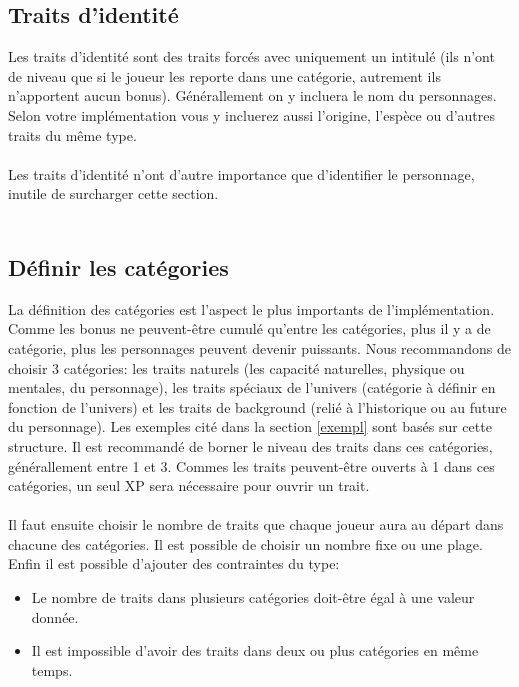 \documentclass[a4paper,10pt,twoside,twocolumn]{article}
\begin{document}
 \subsection{Traits d'identité}
 \label{implem::traits}
 
 Les traits d'identité sont des traits forcés avec uniquement un intitulé (ils n'ont de niveau que si le joueur les reporte dans une catégorie, autrement ils n'apportent aucun bonus). Générallement on y incluera le nom du personnages. Selon votre implémentation vous y incluerez aussi l'origine, l'espèce ou d'autres traits du même type.\\
 \\
 Les traits d'identité n'ont d'autre importance que d'identifier le personnage, inutile de surcharger cette section.\\
 \\
 
 \subsection{Définir les catégories}
 \label{implem::cat}
 
 La définition des catégories est l'aspect le plus importants de l'implémentation. Comme les bonus ne peuvent-être cumulé qu'entre les catégories, plus il y a de catégorie, plus les personnages peuvent devenir puissants. Nous recommandons de choisir 3 catégories: les traits naturels (les capacité naturelles, physique ou mentales, du personnage), les traits spéciaux de l'univers (catégorie à définir en fonction de l'univers) et les traits de background (relié à l'historique ou au future du personnage). Les exemples cité dans la section \ref{exempl} sont basés sur cette structure. Il est recommandé de borner le niveau des traits dans ces catégories, générallement entre 1 et 3. Commes les traits peuvent-être ouverts à 1 dans ces catégories, un seul XP sera nécessaire pour ouvrir un trait.\\
 \\
 Il faut ensuite choisir le nombre de traits que chaque joueur aura au départ dans chacune des catégories. Il est possible de choisir un nombre fixe ou une plage. Enfin il est possible d'ajouter des contraintes du type:
 
 \begin{itemize}
  \item Le nombre de traits dans plusieurs catégories doit-être égal à une valeur donnée.
  \item Il est impossible d'avoir des traits dans deux ou plus catégories en même temps.
 \end{itemize}
\end{document}
